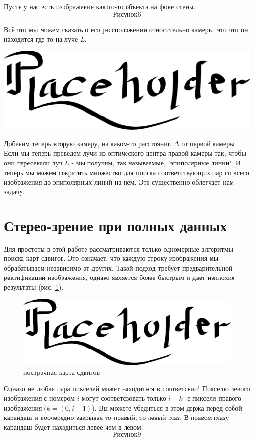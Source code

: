 	Пусть у нас есть изображение какого-то объекта на фоне стены.
	$$Рисунок 6$$
	
	Всё что мы можем сказать о его рассположении относительно камеры, это что он находится где-то на луче $L$.
	
	\includegraphics[scale = 0.75]{placeholder}
	
	Добавим теперь вторую камеру, на каком-то расстоянии $\Delta$ от первой камеры. Если мы теперь проведем лучи из оптического центра правой камеры так, чтобы они пересекали луч $L$ - мы получим, так называемые, "эпиполярные линии". И теперь мы можем сократить множество для поиска соответствующих пар со всего изображения до эпиполярных линий на нём. Это существенно облегчает нам задачу.
	
	
\section{Стерео-зрение при полных данных}
Для простоты в этой работе рассматриваются только одномерные алгоритмы поиска карт сдвигов. Это означает, что каждую строку изображения мы обрабатываем независимо от других. Такой подход требует предварительной ректификации изображения, однако является более быстрым и дает неплохие результаты (рис. \ref{results}).
\begin{figure}
	\centering
	\includegraphics[scale = 0.75]{placeholder}
	\caption{построчная карта сдвигов}
	\label{results}
\end{figure}
	
	Однако не любая пара пикселей может находиться в соответсвии! Пикселю левого изображения с номером $i$ могут соответсвовать только $i-k$ -е  пиксели правого изображения ($k = (0,i-1)$). Вы можете убедиться в этом держа перед собой карандаш и поочередно закрывая то правый, то левый глаз. В правом глазу карандаш будет находиться левее чем в левом.
	$$Рисунок 9$$
	

